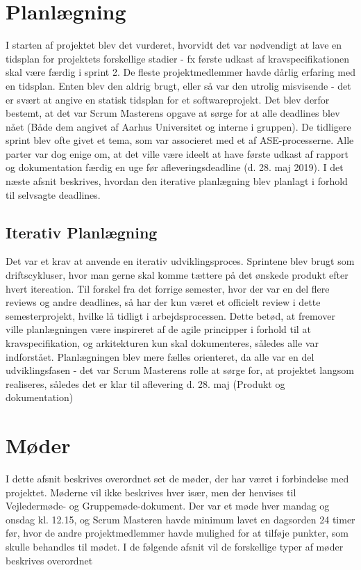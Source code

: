 \documentclass[a4paper,12pt,fleqn,oneside]{article}
\begin{document}
\section{Planlægning}
I starten af projektet blev det vurderet, hvorvidt det var nødvendigt at lave en tidsplan for projektets forskellige stadier - fx første udkast af kravspecifikationen skal være færdig i sprint 2. De fleste projektmedlemmer havde dårlig erfaring med en tidsplan. Enten blev den aldrig brugt, eller så var den utrolig misvisende - det er svært at angive en statisk tidsplan for et softwareprojekt. Det blev derfor bestemt, at det var Scrum Masterens opgave at sørge for at alle deadlines blev nået (Både dem angivet af Aarhus Universitet og interne i gruppen). De tidligere sprint blev ofte givet et tema, som var associeret med et af ASE-processerne. Alle parter var dog enige om, at det ville være ideelt at have første udkast af rapport og dokumentation færdig en uge før afleveringsdeadline (d. 28. maj 2019). I det næste afsnit beskrives, hvordan den iterative planlægning blev planlagt i forhold til selvsagte deadlines. 

\subsection{Iterativ Planlægning}
Det var et krav at anvende en iterativ udviklingsproces. Sprintene blev brugt som driftscykluser, hvor man gerne skal komme tættere på det ønskede produkt efter hvert itereation. Til forskel fra det forrige semester, hvor der var en del flere reviews og andre deadlines, så har der kun været et officielt review i dette semesterprojekt, hvilke lå tidligt i arbejdsprocessen. Dette betød, at fremover ville planlægningen være inspireret af de agile principper i forhold til at kravspecifikation, og arkitekturen kun skal dokumenteres, således alle var indforstået. Planlægningen blev mere fælles orienteret, da alle var en del udviklingsfasen - det var Scrum Masterens rolle at sørge for, at projektet langsom realiseres, således det er klar til aflevering d. 28. maj (Produkt og dokumentation) 

\section{Møder}
I dette afsnit beskrives overordnet set de møder, der har været i forbindelse med projektet. Møderne vil ikke beskrives hver især, men der henvises til Vejledermøde- og Gruppemøde-dokument. Der var et møde hver mandag og onsdag kl. 12.15, og Scrum Masteren havde minimum lavet en dagsorden 24 timer før, hvor de andre projektmedlemmer havde mulighed for at tilføje punkter, som skulle behandles til mødet.  I de følgende afsnit vil de forskellige typer af møder beskrives overordnet 
\end{document}
